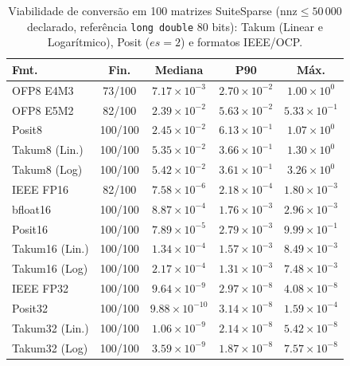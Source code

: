 \begin{table}[t]
\caption{Viabilidade de convers\~ao em 100 matrizes SuiteSparse ($\mathrm{nnz} \le 50\,000$ declarado, refer\^encia \texttt{long double} 80 bits): Takum (Linear e Logar\'itmico), Posit ($es=2$) e formatos IEEE/OCP.}
\label{tab:suitesparse100}
\centering
\scriptsize
\setlength{\tabcolsep}{3.0pt}
\renewcommand{\arraystretch}{0.95}
\begin{tabular}{@{}lcccc@{}}
\toprule
Fmt. & Fin. & Mediana & P90 & M\'ax. \\
\midrule
OFP8 E4M3 & 73/100 & $7.17 \times 10^{-3}$ & $2.70 \times 10^{-2}$ & $1.00 \times 10^{0}$ \\
OFP8 E5M2 & 82/100 & $2.39 \times 10^{-2}$ & $5.63 \times 10^{-2}$ & $5.33 \times 10^{-1}$ \\
Posit8 & 100/100 & $2.45 \times 10^{-2}$ & $6.13 \times 10^{-1}$ & $1.07 \times 10^{0}$ \\
Takum8 (Lin.) & 100/100 & $5.35 \times 10^{-2}$ & $3.66 \times 10^{-1}$ & $1.30 \times 10^{0}$ \\
Takum8 (Log) & 100/100 & $5.42 \times 10^{-2}$ & $3.61 \times 10^{-1}$ & $3.26 \times 10^{0}$ \\
\midrule
IEEE FP16 & 82/100 & $7.58 \times 10^{-6}$ & $2.18 \times 10^{-4}$ & $1.80 \times 10^{-3}$ \\
bfloat16 & 100/100 & $8.87 \times 10^{-4}$ & $1.76 \times 10^{-3}$ & $2.96 \times 10^{-3}$ \\
Posit16 & 100/100 & $7.89 \times 10^{-5}$ & $2.79 \times 10^{-3}$ & $9.99 \times 10^{-1}$ \\
Takum16 (Lin.) & 100/100 & $1.34 \times 10^{-4}$ & $1.57 \times 10^{-3}$ & $8.49 \times 10^{-3}$ \\
Takum16 (Log) & 100/100 & $2.17 \times 10^{-4}$ & $1.31 \times 10^{-3}$ & $7.48 \times 10^{-3}$ \\
\midrule
IEEE FP32 & 100/100 & $9.64 \times 10^{-9}$ & $2.97 \times 10^{-8}$ & $4.08 \times 10^{-8}$ \\
Posit32 & 100/100 & $9.88 \times 10^{-10}$ & $3.14 \times 10^{-8}$ & $1.59 \times 10^{-4}$ \\
Takum32 (Lin.) & 100/100 & $1.06 \times 10^{-9}$ & $2.14 \times 10^{-8}$ & $5.42 \times 10^{-8}$ \\
Takum32 (Log) & 100/100 & $3.59 \times 10^{-9}$ & $1.87 \times 10^{-8}$ & $7.57 \times 10^{-8}$ \\
\bottomrule
\end{tabular}
\end{table}
